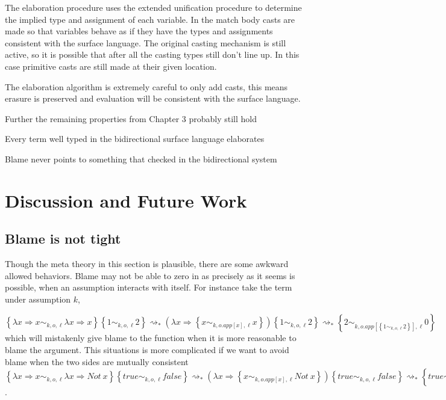The elaboration procedure uses the extended unification procedure
to determine the implied type and assignment of each variable. In
the match body casts are made so that variables behave as if they
have the types and assignments consistent with the surface language.
The original casting mechanism is still active, so it is possible
that after all the casting types still don't line up. In this case
primitive casts are still made at their given location.


The elaboration algorithm is extremely careful to only add casts,
this means erasure is preserved and evaluation will be consistent
with the surface language.

Further the remaining properties from Chapter 3 probably still hold
\begin{conjecture}
Every term well typed in the bidirectional surface language elaborates 
\end{conjecture}

\begin{conjecture}
Blame never points to something that checked in the bidirectional
system 
\end{conjecture}


\section{Discussion and Future Work}

\subsection{Blame is not tight}

Though the meta theory in this section is plausible, there are some
awkward allowed behaviors. Blame may not be able to zero in as precisely
as it seems is possible, when an assumption interacts with itself.
For instance take the term under assumption $k$,

$\left\{ \lambda x\Rightarrow x\sim_{k,o,\ell}\lambda x\Rightarrow x\right\} \left\{ 1\sim_{k,o,\ell}2\right\} \rightsquigarrow_{*}\left(\lambda x\Rightarrow\left\{ x\sim_{k,o.app[x],\ell}x\right\} \right)\left\{ 1\sim_{k,o,\ell}2\right\} \rightsquigarrow_{*}\left\{ 2\sim_{k,o.app[\left\{ 1\sim_{k,o,\ell}2\right\} ],\ell}0\right\} $
which will mistakenly give blame to the function when it is more reasonable
to blame the argument. This situations is more complicated if we want
to avoid blame when the two sides are mutually consistent $\left\{ \lambda x\Rightarrow x\sim_{k,o,\ell}\lambda x\Rightarrow Not\ x\right\} \left\{ true\sim_{k,o,\ell}false\right\} \rightsquigarrow_{*}\left(\lambda x\Rightarrow\left\{ x\sim_{k,o.app[x],\ell}Not\ x\right\} \right)\left\{ true\sim_{k,o,\ell}false\right\} \rightsquigarrow_{*}\left\{ true\sim_{k,o.app[\left\{ true\sim_{k,o,\ell}false\right\} ],\ell}true\right\} $.

